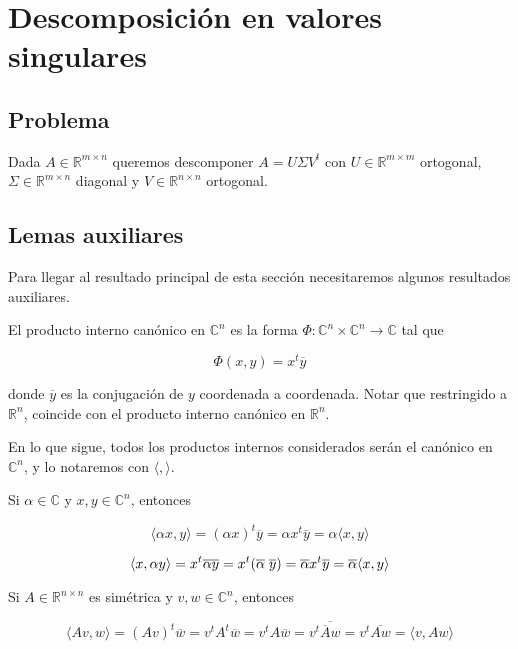 \section{Descomposición en valores singulares}

\subsection{Problema}

Dada $A \in \mathbb{R}^{m \times n}$ queremos descomponer $A = U \Sigma V^t$ con $U \in \mathbb{R}^{m \times m}$ ortogonal, $\Sigma \in \mathbb{R}^{m \times n}$ diagonal y $V\in \mathbb{R}^{n \times n}$ ortogonal.

\subsection{Lemas auxiliares}

Para llegar al resultado principal de esta sección necesitaremos algunos resultados auxiliares.

\begin{obs}
El producto interno canónico en $\mathbb{C}^n$ es la forma $\Phi: \mathbb{C}^n \times \mathbb{C}^n \to \mathbb{C}$ tal que

\[\Phi(x, y) = x^t \overline{y}\]

donde $\overline{y}$ es la conjugación de $y$ coordenada a coordenada. Notar que restringido a $\mathbb{R}^n$, coincide con el producto interno canónico en $\mathbb{R}^n$.
\end{obs}

En lo que sigue, todos los productos internos considerados serán el canónico en $\mathbb{C}^n$, y lo notaremos con $\langle, \rangle$.

\begin{obs}
Si $\alpha \in \mathbb{C}$ y $x, y \in \mathbb{C}^n$, entonces

\[\langle \alpha x, y \rangle = (\alpha x)^t \overline{y} = \alpha x^t \overline{y} = \alpha \langle x, y \rangle\]

\[\langle x, \alpha y \rangle = x^t \overline{\alpha y} = x^t (\overline{\alpha} \hspace{1mm} \overline{y}) = \overline{\alpha} x^t \overline{y} = \overline{\alpha} \langle x, y \rangle\]
\end{obs}

\begin{obs}
Si $A \in \mathbb{R}^{n \times n}$ es simétrica y $v, w \in \mathbb{C}^n$, entonces

\[\langle Av, w \rangle = (Av)^t \overline{w} = v^t A^t \overline{w} = v^t A \overline{w} = v^t \overline{\overline{A} w} = v^t \overline{A w} = \langle v, Aw \rangle\]
\end{obs}

